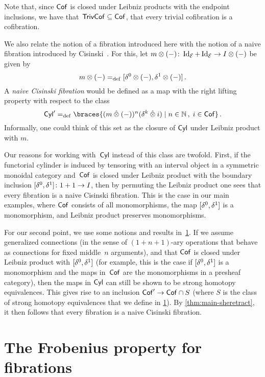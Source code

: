 \documentclass[reqno,10pt,a4paper,oneside,draft]{amsart}
\begin{document}
Note that, since $\mathsf{Cof}$ is closed under Leibniz products with the endpoint inclusions, we have that~$\mathsf{TrivCof} \subseteq \mathsf{Cof}$, \ie that every trivial cofibration is a cofibration.
\begin{remark} \label{cisinski-remark}
We also relate the notion of a fibration introduced here with the notion of a naive fibration introduced by Cisinski~\cite{cisinski-asterisque}.
For this, let $m \otimes (-)  \colon \operatorname{Id}_{\mathcal{E}} + \operatorname{Id}_{\mathcal{E}} \to I \otimes (-)$ be given by
\[
m \otimes (-) =_{\operatorname{def}} [\delta^0 \otimes (-), \delta^1 \otimes (-)]
\, .\]
A \emph{naive Cisinski fibration} would be defined as a map with the right lifting property with respect to the class
\[
\Cyl' \defeq \braces{(m \hatotimes (-))^n (\kcyl \hatotimes i) \mid n \in \mathbb{N} \, , \;  i \in \Cof}
\, .\]
Informally, one could think of this set as the closure of $\mathsf{Cyl}$ under Leibniz product with $m$.

Our reasons for working with~$\mathsf{Cyl}$ instead of this class are twofold.
First, if the functorial cylinder is induced by tensoring with an interval object in a symmetric monoidal category and~$\mathsf{Cof}$ is closed under Leibniz product with the boundary inclusion $[\delta^0, \delta^1] \colon 1 + 1 \to I$, then by permuting the Leibniz product one sees that every fibration is a naive Cisinski fibration.
This is the case in our main examples, where $\mathsf{Cof}$ consists of all monomorphisms, the map $[\delta^0, \delta^1]$ is a monomorphism, and Leibniz product preserves monomorphisms.

For our second point, we use some notions and results in~\cref{sec:frob}.
If we assume generalized connections (in the sense of $(1+n+1)$-ary operations that behave as connections for fixed middle~$n$ arguments), and that $\mathsf{Cof}$ is closed under Leibniz product with $[\delta^0, \delta^1]$ (for example, this is the case if $[\delta^0, \delta^1]$ is a monomorphism and the maps in~$\mathsf{Cof}$ are the monomorphisms in a presheaf category), then the maps in $\mathsf{Cyl}$ can still be shown to be strong homotopy equivalences.
This gives rise to an inclusion $\mathsf{Cof}' \to \mathsf{Cof} \cap S$ (where $S$ is the class of strong homotopy equivalences that we define in \cref{sec:frob}).
By \cref{thm:main-sheretract}, it then follows that every fibration is a naive Cisinski fibration.
\end{remark}

\section{The Frobenius property for fibrations}
\label{sec:frob}
\end{document}
